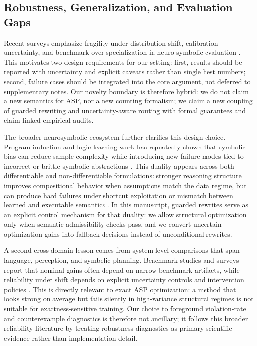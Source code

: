 \documentclass{article} %
\begin{document}
\subsection{Robustness, Generalization, and Evaluation Gaps}
Recent surveys emphasize fragility under distribution shift, calibration uncertainty, and benchmark over-specialization in neuro-symbolic evaluation \citep{src_028,src_029,src_035,src_041,src_042,src_043,src_044}. This motivates two design requirements for our setting: first, results should be reported with uncertainty and explicit caveats rather than single best numbers; second, failure cases should be integrated into the core argument, not deferred to supplementary notes. Our novelty boundary is therefore hybrid: we do not claim a new semantics for ASP, nor a new counting formalism; we claim a new coupling of guarded rewriting and uncertainty-aware routing with formal guarantees and claim-linked empirical audits.

The broader neurosymbolic ecosystem further clarifies this design choice. Program-induction and logic-learning work has repeatedly shown that symbolic bias can reduce sample complexity while introducing new failure modes tied to incorrect or brittle symbolic abstractions \citep{src_017,src_020,src_036}. This duality appears across both differentiable and non-differentiable formulations: stronger reasoning structure improves compositional behavior when assumptions match the data regime, but can produce hard failures under shortcut exploitation or mismatch between learned and executable semantics \citep{src_030,src_031}. In this manuscript, guarded rewrites serve as an explicit control mechanism for that duality: we allow structural optimization only when semantic admissibility checks pass, and we convert uncertain optimization gains into fallback decisions instead of unconditional rewrites.

A second cross-domain lesson comes from system-level comparisons that span language, perception, and symbolic planning. Benchmark studies and surveys report that nominal gains often depend on narrow benchmark artifacts, while reliability under shift depends on explicit uncertainty controls and intervention policies \citep{src_018,src_021,src_026,src_027,src_038}. This is directly relevant to exact ASP optimization: a method that looks strong on average but fails silently in high-variance structural regimes is not suitable for exactness-sensitive training. Our choice to foreground violation-rate and counterexample diagnostics is therefore not ancillary; it follows this broader reliability literature by treating robustness diagnostics as primary scientific evidence rather than implementation detail.
\end{document}
